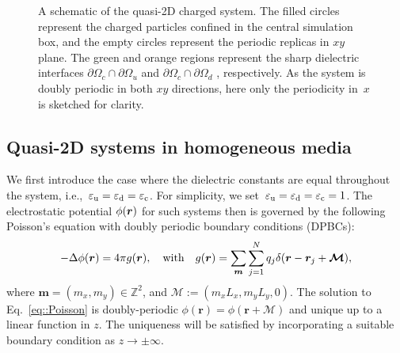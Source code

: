 \begin{figure}[htbp]
    \caption{
        A schematic of the quasi-2D charged system.
        The filled circles represent the charged particles confined in the central simulation box, and the empty circles represent the periodic replicas in $xy$ plane.
        The green and orange regions represent the sharp dielectric interfaces $\partial \Omega_c \cap \partial \Omega_{u}$ and $\partial \Omega_c \cap \partial \Omega_{d}$ , respectively.
        As the system is doubly periodic in both $xy$ directions, here only the periodicity in~$x$ is sketched for clarity.
    }
    \label{fig:box}
\end{figure}

\subsection{Quasi-2D systems in homogeneous media}

We first introduce the case where the dielectric constants are equal throughout the system, i.e.,~$\varepsilon_{\mathrm{u}} = \varepsilon_{\mathrm{d}} = \varepsilon_{\mathrm{c}}$. For simplicity, we set~$\varepsilon_{\mathrm{u}} = \varepsilon_{\mathrm{d}} = \varepsilon_{\mathrm{c}} = 1$.
The electrostatic potential $\phi(\boldsymbol{r})$ for such systems then is governed by the following Poisson's equation with doubly periodic boundary conditions (DPBCs):
\begin{equation}\label{eq::Poisson}
	-\Delta\phi(\bm{r}) = 4\pi g(\bm{r}), \quad \text{with} \quad g(\bm{r})= \sum_{\V{m}}\sum_{j=1}^{N}q_{j}\delta(\bm{r}-\bm{r}_{j}+\bm{\mathcal{M}}),%
\end{equation}
where $\bm{m}=(m_x,m_y) \in\mathbb{Z}^2$, and $\bm{\mathcal{M}} := (m_x L_x, m_y L_y, 0)$.
The solution to Eq.~\eqref{eq::Poisson} is doubly-periodic $\phi(\bm{r})=\phi(\bm{r} + \bm{\mathcal{M}})$ and unique up to a linear function in $z$. The uniqueness will be satisfied by incorporating a suitable boundary condition as $z\to\pm\infty$.


